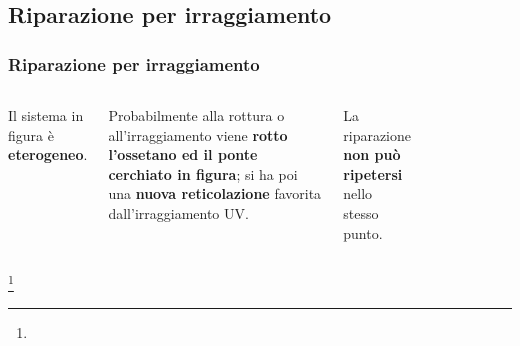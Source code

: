 \subsection{Riparazione per irraggiamento}
\begin{frame}\frametitle{Riparazione per irraggiamento}
\begin{columns}
Il sistema in figura è \textbf{eterogeneo}. 

Probabilmente alla rottura o all'irraggiamento viene \textbf{rotto l'ossetano ed il ponte cerchiato in figura}; si ha poi una \textbf{nuova reticolazione} favorita dall'irraggiamento UV.

La riparazione \textbf{non può ripetersi} nello stesso punto.


\begin{figure}{}\end{figure}
\end{columns}
\footnote{\tiny  {}}

\end{frame}





